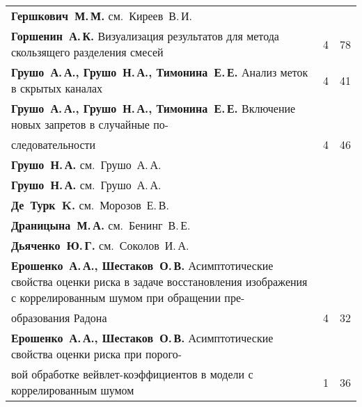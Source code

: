 {\begin{tabular}{p{388pt}rr}
\textbf{Гершкович~М.\,М.} см.\ Киреев~В.\,И.&&\\
\textbf{Горшенин~А.\,К.} Визуализация результатов для метода скользящего разделения
смесей %
&4&78\\
\textbf{Грушо~А.\,А., Грушо~Н.\,А., Тимонина~Е.\,Е.} Анализ меток в скрытых
каналах\dotfill&4&41\\
\textbf{Грушо~А.\,А., Грушо~Н.\,А., Тимонина~Е.\,Е.} Включение новых запретов в
случайные по-\linebreak
\vspace*{-12pt}\\
\hspace*{23pt}следовательности\dotfill&4&46\\
\textbf{Грушо~Н.\,А.} см.\ Грушо~А.\,А.&&\\
\textbf{Грушо~Н.\,А.} см.\ Грушо~А.\,А.&&\\
\textbf{Де~Турк~K.} см.\ Морозов~Е.\,В.&&\\
\textbf{Драницына~М.\,А.} см.\ Бенинг~В.\,Е.&&\\
\textbf{Дьяченко~Ю.\,Г.} см.\ Соколов~И.\,А.&&\\
\hangindent=23pt\noindent\textbf{Ерошенко~А.\,А., Шестаков~О.\,В.} Асимптотические свойства оценки риска в
задаче восстановления изображения с коррелированным  шумом при обращении
пре-\linebreak
\vspace*{-12pt}\\
\hspace*{23pt}образования Радона\dotfill&4&32\\
\textbf{Ерошенко~А.\,А., Шестаков~О.\,В.} Асимптотические свойства оценки риска при
порого-\linebreak
\vspace*{-12pt}\\
\hspace*{23pt}вой обработке вейвлет-коэффициентов в модели с коррелированным
шумом\dotfill&1&36\\
\end{tabular}
}

\pagebreak

\def\leftkol{АВТОРСКИЙ УКАЗАТЕЛЬ ЗА 2014 г.} %

\def\rightkol{АВТОРСКИЙ УКАЗАТЕЛЬ ЗА 2014 г.} %

\def\leftfootline{\small{\textbf{\thepage}
\hfill ИНФОРМАТИКА И ЕЁ ПРИМЕНЕНИЯ\ \ \ том~8\ \ \ выпуск~4\ \ \ 2014}
}%
 \def\rightfootline{\small{ИНФОРМАТИКА И ЕЁ ПРИМЕНЕНИЯ\ \ \ том~8\ \ \ выпуск~4\ \ \ 2014
 \hfill \textbf{\thepage}}}


